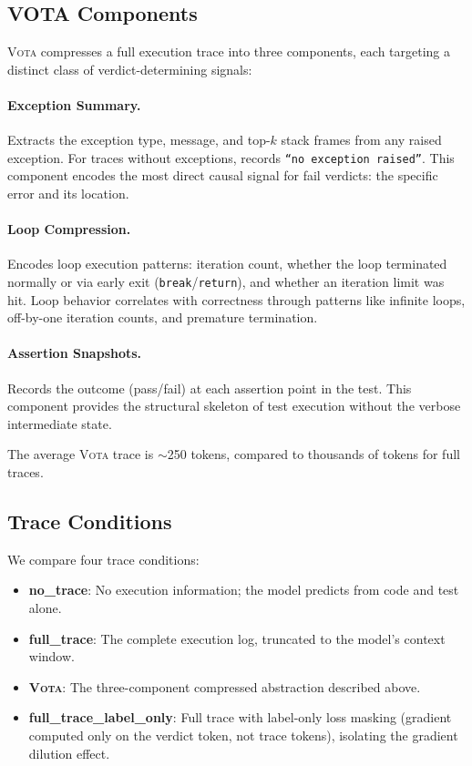 \documentclass[11pt,a4paper]{article}
\newcommand{\vota}{\textsc{Vota}}
\begin{document}
\subsection{VOTA Components}

\vota{} compresses a full execution trace into three components, each targeting a distinct class of verdict-determining signals:

\paragraph{Exception Summary.}
Extracts the exception type, message, and top-$k$ stack frames from any raised exception.
For traces without exceptions, records \texttt{``no exception raised''}.
This component encodes the most direct causal signal for fail verdicts: the specific error and its location.

\paragraph{Loop Compression.}
Encodes loop execution patterns: iteration count, whether the loop terminated normally or via early exit (\texttt{break}/\texttt{return}), and whether an iteration limit was hit.
Loop behavior correlates with correctness through patterns like infinite loops, off-by-one iteration counts, and premature termination.

\paragraph{Assertion Snapshots.}
Records the outcome (pass/fail) at each assertion point in the test.
This component provides the structural skeleton of test execution without the verbose intermediate state.

The average \vota{} trace is $\sim$250 tokens, compared to thousands of tokens for full traces.

\subsection{Trace Conditions}

We compare four trace conditions:
\begin{itemize}
\item \textbf{no\_trace}: No execution information; the model predicts from code and test alone.
\item \textbf{full\_trace}: The complete execution log, truncated to the model's context window.
\item \textbf{\vota{}}: The three-component compressed abstraction described above.
\item \textbf{full\_trace\_label\_only}: Full trace with label-only loss masking (gradient computed only on the verdict token, not trace tokens), isolating the gradient dilution effect.
\end{itemize}
\end{document}
